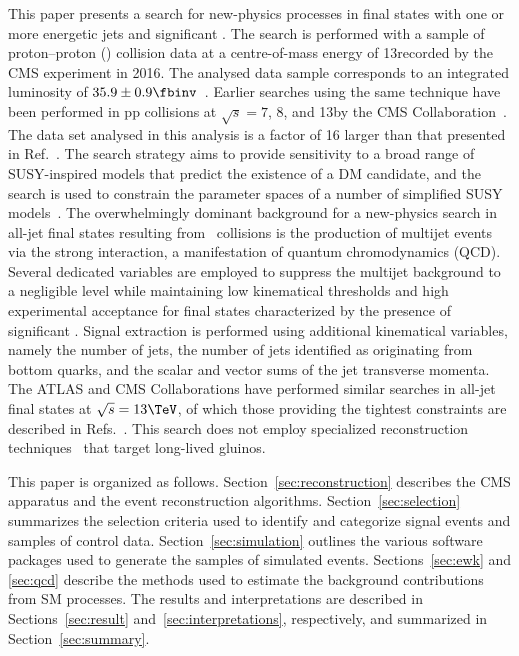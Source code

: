 This paper presents a search for new-physics processes in final states
with one or more energetic jets and significant \ptvecmiss. The search
is performed with a sample of proton--proton (\Pp\Pp) collision data
at a centre-of-mass energy of 13\TeV recorded by the CMS experiment in
2016.  The analysed data sample corresponds to an integrated
luminosity of $35.9 \pm 0.9\fbinv$~\cite{CMS:2017sdi}. Earlier
searches using the same technique have been performed in pp collisions
at $\sqrt{s} = 7$, 8, and 13\TeV by the CMS
Collaboration~\cite{Khachatryan:2011tk, Chatrchyan:2011zy,
  Chatrchyan:2012wa, Chatrchyan:2013mys, Khachatryan:2016pxa,
  Khachatryan:2016dvc}. The data set analysed in this analysis is a
factor of 16 larger than that presented in
Ref.~\cite{Khachatryan:2016dvc}. The search strategy aims to provide
sensitivity to a broad range of SUSY-inspired models that predict the
existence of a DM candidate, and the search is used to constrain the
parameter spaces of a number of simplified SUSY
models~\cite{Alwall:2008ag, Alwall:2008va, sms}. The overwhelmingly
dominant background for a new-physics search in all-jet final states
resulting from \Pp\Pp\ collisions is the production of multijet events
via the strong interaction, a manifestation of quantum chromodynamics
(QCD). Several dedicated variables are employed to suppress the
multijet background to a negligible level while maintaining low
kinematical thresholds and high experimental acceptance for final
states characterized by the presence of significant \ptvecmiss. Signal
extraction is performed using additional kinematical variables, namely
the number of jets, the number of jets identified as originating from
bottom quarks, and the scalar and vector sums of the jet transverse
momenta. The ATLAS and CMS Collaborations have performed similar
searches in all-jet final states at $\sqrt{s} = 13\TeV$, of which
those providing the tightest constraints are described in
Refs.~\cite{Aaboud:2016zdn, Sirunyan:2017cwe, Sirunyan:2017kqq}. This
search does not employ specialized reconstruction
techniques~\cite{Khachatryan:2010uf, Khachatryan:2011ts, Aad:2011yf,
  Aad:2012zn, Chatrchyan:2012sp, Aad:2013gva, Khachatryan:2015jha,
  Aad:2015rba, Aaboud:2016dgf, Khachatryan:2016sfv, Aaboud:2017iio}
that target long-lived gluinos.

This paper is organized as follows. Section~\ref{sec:reconstruction}
describes the CMS apparatus and the event reconstruction
algorithms. Section~\ref{sec:selection} summarizes the selection
criteria used to identify and categorize signal events and samples of
control data. Section~\ref{sec:simulation} outlines the various
software packages used to generate the samples of simulated
events. Sections~\ref{sec:ewk} and \ref{sec:qcd} describe the methods
used to estimate the background contributions from SM processes. The
results and interpretations are described in Sections~\ref{sec:result}
and~\ref{sec:interpretations}, respectively, and summarized in
Section~\ref{sec:summary}.

